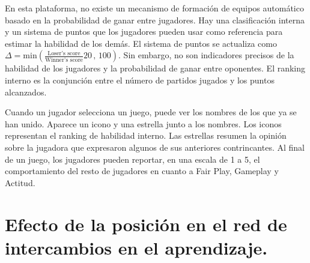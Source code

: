\documentclass[a4paper,10pt]{book}
\theoremstyle{definition}
\begin{document}

En esta plataforma, no existe un mecanismo de formaci\'on de equipos automático basado en la probabilidad de ganar entre jugadores.
%
Hay una clasificaci\'on interna y un sistema de puntos que los jugadores pueden usar como referencia para estimar la habilidad de los demás.
%
El sistema de puntos se actualiza como {\small $\Delta = \text{min}(\frac{\text{Loser's score}}{\text{Winner's score}}20\,,\,100 )$}.
%
Sin embargo, no son indicadores precisos de la habilidad de los jugadores y la probabilidad de ganar entre oponentes.
%
El ranking interno es la conjunci\'on entre el n\'umero de partidos jugados y los puntos alcanzados.


Cuando un jugador selecciona un juego, puede ver los nombres de los que ya se han unido.
%
Aparece un icono y una estrella junto a los nombres.
%
Los iconos representan el ranking de habilidad interno.
%
Las estrellas resumen la opini\'on sobre la jugadora que expresaron algunos de sus anteriores contrincantes.
%
Al final de un juego, los jugadores pueden reportar, en una escala de 1 a 5, el comportamiento del resto de jugadores en cuanto a Fair Play, Gameplay y Actitud.


\section{Efecto de la posici\'on en el red de intercambios en el aprendizaje.} \label{ch:topo}
\end{document}
